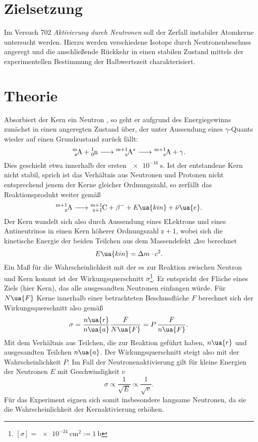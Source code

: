 \setcounter{page}{1}
\section*{Zielsetzung}
Im Versuch 702 \textit{Aktivierung durch Neutronen} soll der Zerfall instabiler Atomkerne untersucht werden.
Hierzu werden verschiedene Isotope durch Neutronenbeschuss angeregt und die anschließende Rückkehr in einen
stabilen Zustand mittels der experimentellen Bestimmung der Halbwertszeit charakterisiert.
\section{Theorie}
Absorbiert der Kern  ein Neutron , so geht er aufgrund des Energiegewinns
zunächst in einen angeregten Zustand über, der unter Aussendung eines $\gamma$-Quants wieder
auf einen Grundzustand zurück fällt:
\begin{equation}
  \ce{^m_z A + ^1_0 n -> ^{m+1}_z A^* -> ^{m+1}_z A }+ \gamma.
\end{equation}
Dies geschieht etwa innerhalb der ersten $\SI{e-16}{\second}$. Ist der entstandene Kern 
nicht stabil, sprich ist das Verhältnis aus Neutronen und Protonen nicht entsprechend jenem der Kerne
gleicher Ordnungszahl, so zerfällt das Reaktionsprodukt weiter gemäß
\begin{equation}
  \ce{^{m+1}_z A -> ^{m+1}_{z+1} C }+ \beta^{-} + E\ua{kin} + \bar{\nu}\ua{e}.
\end{equation}
Der Kern wandelt sich also durch Aussendung eines ELektrons und eines Antineutrinos in einen Kern höherer Ordnungszahl $\mathup{z} + 1$, wobei
sich die kinetische Energie der beiden Teilchen aus dem Massendefekt $\Delta m$ berechnet
\begin{equation}
  E\ua{kin} = \Delta m \cdot c^2.
\end{equation}
Ein Maß für die Wahrscheinlichkeit mit der es zur Reaktion zwischen Neutron und Kern kommt ist der Wirkungsquerschnitt
$\sigma$\footnote{$[\sigma] = \SI{e-24}{\centi\meter^2} := \SI{1}{\barn}$}. Er entspricht
der Fläche eines Ziels (hier Kern), das alle ausgesandten Neutronen einfangen würde. Für $N\ua{F}$ Kerne innerhalb einer betrachteten Beschussfläche
$F$ berechnet sich der Wirkungsquerschnitt also gemäß
\begin{equation}
  \sigma = \frac{n\ua{r}}{n\ua{a}}\frac{F}{N\ua{F}} = P \,\frac{F}{n\ua{F}}.
\end{equation}
Mit dem Verhältnis aus Teilchen, die zur Reaktion geführt haben, $n\ua{r}$ und ausgesandten Teilchen $n\ua{a}$. Der Wirkungsquerschnitt steigt also
mit der Wahrscheinlichkeit $P$. Im Fall der Neutronenaktivierung gilt für kleine Energien der Neutronen $E$ mit Geschwindigkeit $v$
\begin{equation}
  \sigma \propto \frac{1}{\sqrt{E}} \propto \frac{1}{\sqrt{v}}.
\end{equation}
Für das Experiment eignen sich somit insbesondere langsame Neutronen, da sie die Wahrscheinlichkeit der Kernaktivierung erhöhen.
